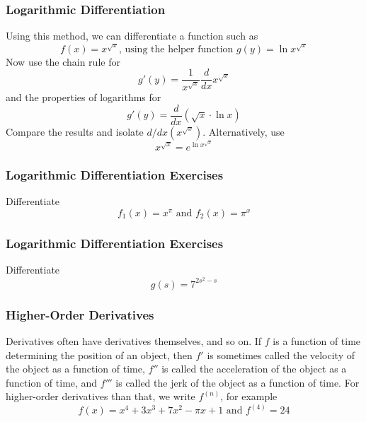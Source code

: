 \documentclass[xcolor=dvipsnames]{beamer}
\begin{document}
\begin{frame}
  \frametitle{Logarithmic Differentiation}
Using this method, we can differentiate a function such as
\begin{equation}
  \label{eq:ooteiquo}
  f(x)=x^{\sqrt{x}}\mbox{, using the helper function }g(y)=\ln{}x^{\sqrt{x}}
\end{equation}
Now use the chain rule for
\begin{equation}
  \label{eq:quuquish}
  g'(y)=\frac{1}{x^{\sqrt{x}}}\frac{d}{dx}x^{\sqrt{x}}
\end{equation}
and the properties of logarithms for
\begin{equation}
  \label{eq:ahfahngi}
  g'(y)=\frac{d}{dx}\left(\sqrt{x}\cdot\ln{}x\right)
\end{equation}
Compare the results and isolate $d/dx(x^{\sqrt{x}})$. Alternatively,
use
\begin{equation}
  \label{eq:gaibahto}
  x^{\sqrt{x}}=e^{\ln{}x^{\sqrt{x}}}
\end{equation}
\end{frame}

\begin{frame}
  \frametitle{Logarithmic Differentiation Exercises}
  {\ubung} Differentiate
  \begin{equation}
    \label{eq:zofohsoi}
    f_{1}(x)=x^{\pi}\mbox{ and }f_{2}(x)=\pi^{x}
  \end{equation}
\end{frame}

\begin{frame}
  \frametitle{Logarithmic Differentiation Exercises}
  {\ubung} Differentiate
  \begin{equation}
    \label{eq:ietaemai}
    g(s)=7^{2s^{2}-s}
  \end{equation}
\end{frame}

\begin{frame}
  \frametitle{Higher-Order Derivatives}
Derivatives often have derivatives themselves, and so on. If $f$ is a
function of time determining the position of an object, then $f'$ is
sometimes called the velocity of the object as a function of time,
$f''$ is called the acceleration of the object as a function of time,
and $f'''$ is called the jerk of the object as a function of time. For
higher-order derivatives than that, we write $f^{(n)}$, for example
\begin{equation}
  \label{eq:zeitohke}
  f(x)=x^{4}+3x^{3}+7x^{2}-\pi{}x+1\mbox{ and }f^{(4)}=24
\end{equation}
\end{frame}
\end{document}

